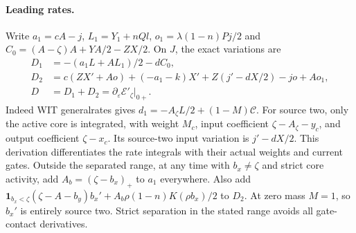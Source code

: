 \documentclass[11pt]{article}
\begin{document}
\paragraph{Leading rates.}
Write $a_1=cA-j$, $L_1=Y_1+nQl$,
$o_1=\lambda(1-n)Pj/2$ and
$C_0=(A-\zeta)A+YA/2-ZX/2$. On $J$, the exact variations are
\begin{align}
 D_1&=-(a_1 L+A L_1)/2-d C_0,\nonumber\\
 D_2&=c(ZX'+Ao)+(-a_1-k)X'
       +Z(j'-dX/2)-jo+Ao_1,\nonumber\\
 D&=D_1+D_2=\partial_\varepsilon\mathcal E'_\zeta|_{0+}.
 \label{an04swpv1:rates}
\end{align}
Indeed WIT generalrates gives $d_1=-A_\zeta L/2+(1-M)\mathcal C$.
For source two, only the active core is integrated, with weight
$M_c$, input coefficient $\zeta-A_\zeta-y_c$, and output coefficient
$\zeta-x_c$. Its source-two input variation is $j'-dX/2$.
This derivation differentiates the rate integrals with their actual
weights and current gates. Outside the separated range, at any time with $b_x\ne\zeta$ and
strict core activity, add $A_b=(\zeta-b_x)_+$ to $a_1$ everywhere.
Also add $\mathbf 1_{b_x<\zeta}(\zeta-A-b_y)b_x'+A_b
\rho(1-n)K(\rho b_x)/2$ to $D_2$.
At zero mass $M=1$, so $b_x'$ is entirely source two. Strict
separation in the stated range avoids all gate-contact derivatives.
\end{document}
